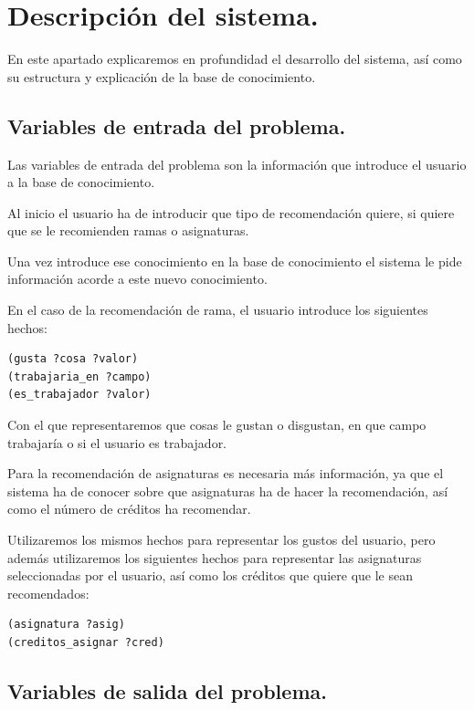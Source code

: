 \documentclass[12pt, spanish]{article}
\begin{document}
\newpage

\section{Descripción del sistema.}

En este apartado explicaremos en profundidad el desarrollo del sistema, así como su estructura y explicación de la base de conocimiento.

\subsection{Variables de entrada del problema.}

Las variables de entrada del problema son la información que introduce el usuario a la base de conocimiento.

Al inicio el usuario ha de introducir que tipo de recomendación quiere, si quiere que se le recomienden ramas o asignaturas.

Una vez introduce ese conocimiento en la base de conocimiento el sistema le pide información acorde a este nuevo conocimiento.

En el caso de la recomendación de rama, el usuario introduce los siguientes hechos:

\begin{lstlisting}
(gusta ?cosa ?valor)
(trabajaria_en ?campo)
(es_trabajador ?valor)
\end{lstlisting}

Con el que representaremos que cosas le gustan o disgustan, en que campo trabajaría o si el usuario es trabajador.

Para la recomendación de asignaturas es necesaria más información, ya que el sistema ha de conocer sobre que asignaturas ha de hacer la recomendación, así como el número de créditos ha recomendar.

Utilizaremos los mismos hechos para representar los gustos del usuario, pero además utilizaremos los siguientes hechos para representar las asignaturas seleccionadas por el usuario, así como los créditos que quiere que le sean recomendados:

\begin{lstlisting}
(asignatura ?asig)
(creditos_asignar ?cred)
\end{lstlisting}


\newpage
\subsection{Variables de salida del problema.}
\end{document}
